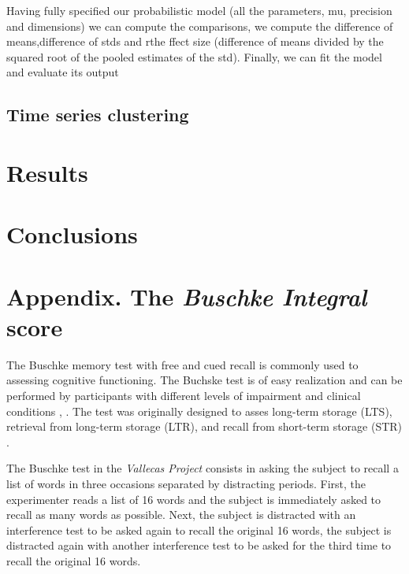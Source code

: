 \documentclass[11pt]{article}
\theoremstyle{definition}
\theoremstyle{remark}
\begin{document}
Having fully specified our probabilistic model (all the parameters, mu, precision and dimensions) we can compute the comparisons, we compute the difference of means,difference of stds and rthe ffect size (difference of means divided by the squared root of the pooled estimates of the std).
Finally, we can fit the model and evaluate its output

\subsection{Time series clustering}
\label{se:res}

\section{Results}
\label{se:res}



\section{Conclusions}
\label{se:con}


\newpage
\section{Appendix. The \emph{Buschke Integral} score}
\label{se:appbusint}

The Buschke memory test with free and cued recall is commonly used to assessing cognitive functioning. The Buchske test is of easy realization and can be performed by participants with different levels of impairment and clinical conditions \cite{o200212}, \cite{leitner2017comparison}. The test was originally designed to asses long-term storage (LTS), retrieval from long-term storage (LTR), and recall from short-term storage (STR) \cite{buschke1973selective}.

The Buschke test in the \emph{Vallecas Project} consists in asking the subject to recall a list of words in three occasions separated by distracting periods. First, the experimenter reads a list of 16 words and the subject is immediately asked to recall as many words as possible. Next, the subject is distracted with an interference test to be asked again to recall the original 16 words, the subject is distracted again with another interference test to be asked for the third time to recall the original 16 words.
\end{document}
